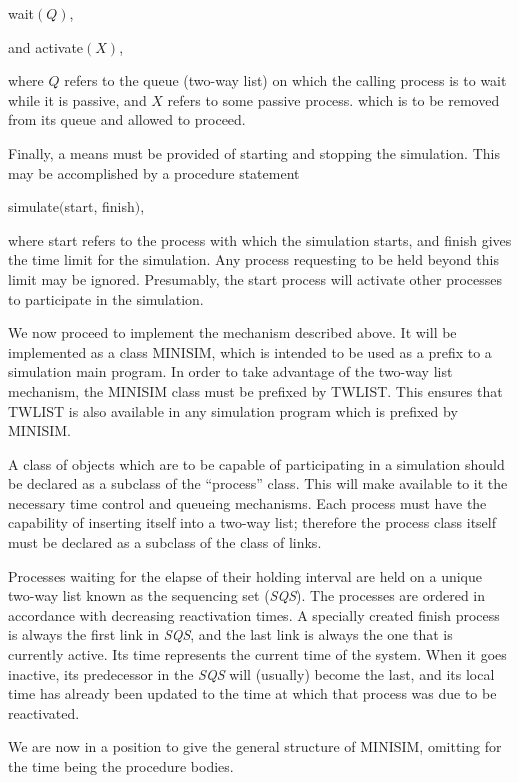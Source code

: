 \documentclass[twoside,11pt]{book}
\begin{document}
\quad wait$(Q)$,

\quad and activate$(X)$,

\noindent
where $Q$ refers to the queue (two-way list) on which the calling process is to wait while it is passive, and $X$ refers to some passive process. which is to be removed from its queue and allowed to proceed.

Finally, a means must be provided of starting and stopping the simulation. This may be accomplished by a procedure statement

\quad simulate$($start, finish$)$,

\noindent
where start refers to the process with which the simulation starts, and finish gives the time limit for the simulation. Any process requesting to be held beyond this limit may be ignored. Presumably, the start process will activate other processes to participate in the simulation.

We now proceed to implement the mechanism described above. It will be implemented as a class MINISIM, which is intended to be used as a prefix to a simulation main program. In order to take advantage of the two-way list mechanism, the MINISIM class must be prefixed by TWLIST. This ensures that TWLIST is also available in any simulation program which is prefixed by MINISIM.

A class of objects which are to be capable of participating in a simulation should be declared as a subclass of the ``process'' class. This will make available to it the necessary time control and queueing mechanisms. Each process must have the capability of inserting itself into a two-way list; therefore the process class itself must be declared as a subclass of the class of links.

Processes waiting for the elapse of their holding interval are held on a unique two-way list known as the sequencing set (\textit{SQS}). The processes are ordered in accordance with decreasing reactivation times. A specially created finish process is always the first link in \textit{SQS}, and the last link is always the one that is currently active. Its time represents the current time of the system. When it goes inactive, its predecessor in the \textit{SQS} will (usually) become the last, and its local time has already been updated to the time at which that process was due to be reactivated.

We are now in a position to give the general structure of MINISIM, omitting for the time being the procedure bodies.
\end{document}
